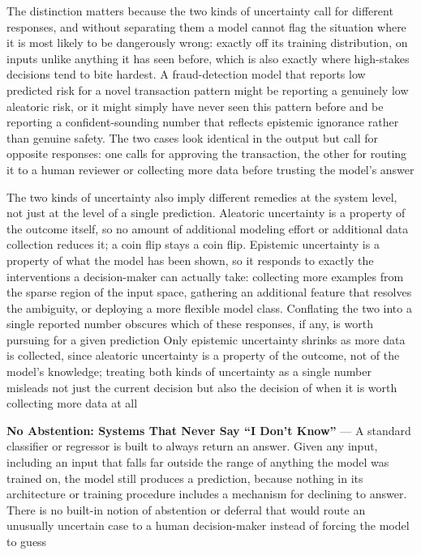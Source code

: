 The distinction matters because the two kinds of uncertainty call for different responses,
and without separating them a model cannot flag the situation where it is most
likely to be dangerously wrong: exactly off its training distribution, on inputs
unlike anything it has seen before, which is also exactly where high-stakes decisions
tend to bite hardest. A fraud-detection model that reports low predicted risk
for a novel transaction pattern might be reporting a genuinely low aleatoric
risk, or it might simply have never seen this pattern before and be reporting a confident-sounding
number that reflects epistemic ignorance rather than genuine safety. The two
cases look identical in the output but call for opposite responses: one calls for
approving the transaction, the other for routing it to a human reviewer or
collecting more data before trusting the model's answer

The two kinds of uncertainty also imply different remedies at the system level,
not just at the level of a single prediction. Aleatoric uncertainty is a property
of the outcome itself, so no amount of additional modeling effort or additional
data collection reduces it; a coin flip stays a coin flip. Epistemic uncertainty
is a property of what the model has been shown, so it responds to exactly the interventions
a decision-maker can actually take: collecting more examples from the sparse
region of the input space, gathering an additional feature that resolves the ambiguity,
or deploying a more flexible model class. Conflating the two into a single reported
number obscures which of these responses, if any, is worth pursuing for a given prediction
Only epistemic uncertainty shrinks as more data is collected, since aleatoric uncertainty
is a property of the outcome, not of the model's knowledge; treating both kinds of
uncertainty as a single number misleads not just the current decision but also the
decision of when it is worth collecting more data at all

\textbf{No Abstention: Systems That Never Say ``I Don't Know''} --- A standard classifier
or regressor is built to always return an answer. Given any input, including an input
that falls far outside the range of anything the model was trained on, the model
still produces a prediction, because nothing in its architecture or training procedure
includes a mechanism for declining to answer. There is no built-in notion of
abstention or deferral that would route an unusually uncertain case to a human
decision-maker instead of forcing the model to guess

